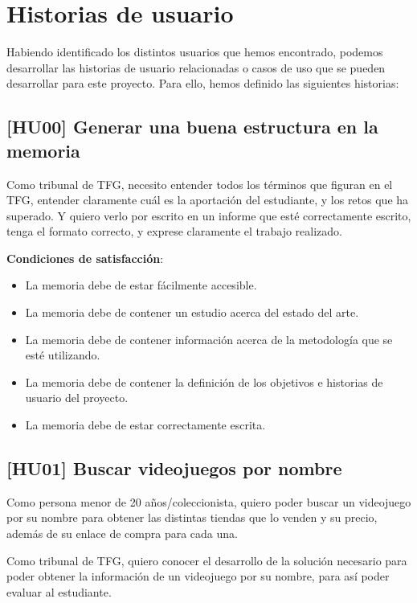\section{Historias de usuario}

Habiendo identificado los distintos usuarios que hemos encontrado, podemos 
desarrollar las historias de usuario relacionadas o casos de uso que se pueden 
desarrollar para este proyecto. Para ello, hemos definido las siguientes historias:

\subsection{[HU00] Generar una buena estructura en la memoria}

Como tribunal de TFG, necesito entender todos los términos que figuran en el TFG, 
entender claramente cuál es la aportación del estudiante, y los retos que ha 
superado. Y quiero verlo por escrito en un informe que esté correctamente escrito, 
tenga el formato correcto, y exprese claramente el trabajo realizado.

\textbf{Condiciones de satisfacción}:

\begin{itemize}
    \item La memoria debe de estar fácilmente accesible.
    \item La memoria debe de contener un estudio acerca del estado del arte.
    \item La memoria debe de contener información acerca de la metodología que se 
    esté utilizando.
    \item La memoria debe de contener la definición de los objetivos e historias de 
    usuario del proyecto.
    \item La memoria debe de estar correctamente escrita.
\end{itemize}

\subsection{[HU01] Buscar videojuegos por nombre}

Como persona menor de 20 años/coleccionista, quiero poder buscar un videojuego por 
su nombre para obtener las distintas tiendas que lo venden y su precio, además de 
su enlace de compra para cada una.

Como tribunal de TFG, quiero conocer el desarrollo de la solución necesario para 
poder obtener la información de un videojuego por su nombre, para así poder 
evaluar al estudiante.

